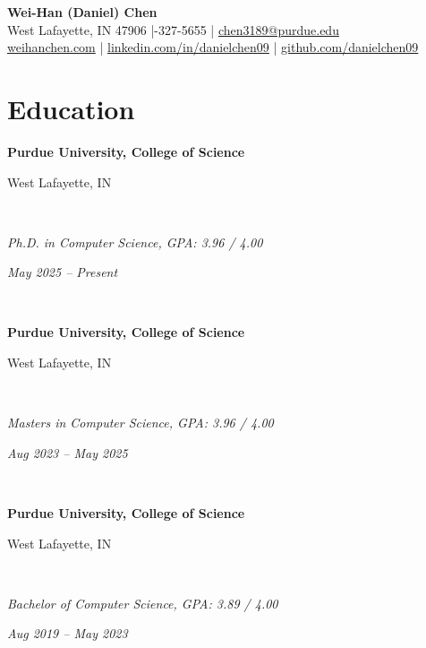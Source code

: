 \documentclass[10pt,letterpaper]{article}
\newcommand{\resumeSubheading}[4]{%
  \begin{minipage}[t]{0.74\textwidth}\raggedright\textbf{#1}\end{minipage}\hfill
  \begin{minipage}[t]{0.23\textwidth}\raggedleft #2\end{minipage}\\[2pt]
  \begin{minipage}[t]{0.74\textwidth}\raggedright\textit{#3}\end{minipage}\hfill
  \begin{minipage}[t]{0.23\textwidth}\raggedleft\textit{#4}\end{minipage}\\[-2pt]
}
\begin{document}
\begin{center}
    {\LARGE \textbf{Wei-Han (\textcolor{accent}{Daniel}) Chen}}\\[2pt]
    West Lafayette, IN 47906 \;|-327-5655 \;|\; \href{mailto:chen3189@purdue.edu}{chen3189@purdue.edu}\\[0pt]
    \href{https://weihanchen.com}{weihanchen.com} \;|\; \href{https://www.linkedin.com/in/danielchen09/}{linkedin.com/in/danielchen09} \;|\; \href{https://github.com/danielchen09}{github.com/danielchen09}
\end{center}

\section{Education}
\resumeSubheading
  {Purdue University, College of Science}
  {West Lafayette, IN}
  {Ph.D. in Computer Science, GPA: 3.96 / 4.00}
  {May 2025 -- Present}
\resumeSubheading
  {Purdue University, College of Science}
  {West Lafayette, IN}
  {Masters in Computer Science, GPA: 3.96 / 4.00}
  {Aug 2023 -- May 2025}
\resumeSubheading
  {Purdue University, College of Science}
  {West Lafayette, IN}
  {Bachelor of Computer Science, GPA: 3.89 / 4.00}
  {Aug 2019 -- May 2023}

\vspace{-8pt}
\end{document}
